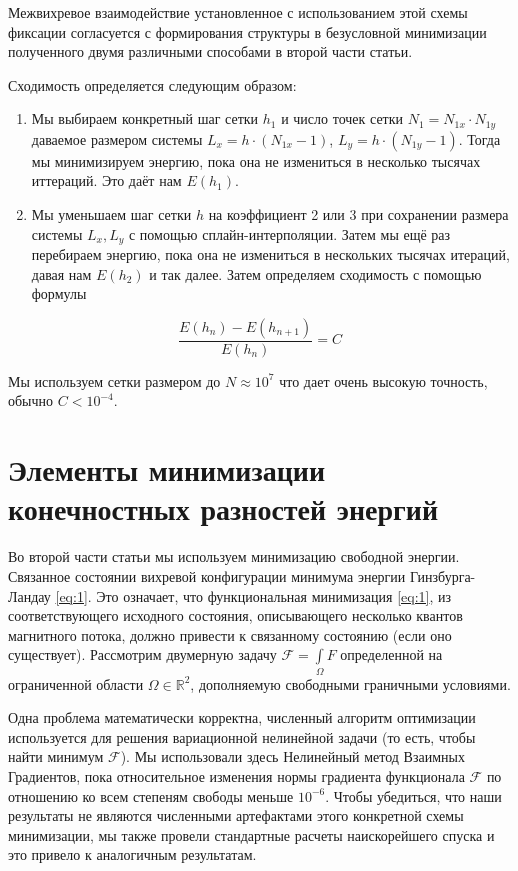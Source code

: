 Межвихревое взаимодействие установленное с использованием этой схемы фиксации 
согласуется с формирования структуры в безусловной минимизации полученного 
двумя различными способами в второй части статьи.

Сходимость определяется следующим образом:
\begin{enumerate}
    \item Мы выбираем конкретный шаг сетки \( h_1 \) и число точек сетки 
        \( N_1 = N_{1x} \cdot N_{1y} \) даваемое размером системы
        \( L_x = h \cdot (N_{1x}-1) \), \( L_y = h \cdot (N_{1y}-1) \). 
        Тогда мы минимизируем энергию, пока она не измениться в несколько
        тысячах иттераций. Это даёт нам \( E(h_1) \).
    \item Мы уменьшаем шаг сетки \( h \) на коэффициент 2 или 3 при сохранении 
        размера системы \( L_x, L_y \) с помощью сплайн-интерполяции. 
        Затем мы ещё раз перебираем энергию, пока она не измениться в 
        нескольких тысячах итераций, давая нам \( E(h_2) \) и так далее. 
        Затем определяем сходимость с помощью формулы
\end{enumerate}
\begin{equation}
    \frac{E(h_n) - E(h_{n+1})}{E(h_n)} = C
\end{equation}

Мы используем сетки размером до \( N \approx 10^7 \) что дает очень высокую 
точность, обычно \( C < 10^{-4} \).

\section{Элементы минимизации конечностных разностей энергий}

Во второй части статьи мы используем минимизацию свободной энергии. Связанное 
состоянии вихревой конфигурации минимума энергии Гинзбурга-Ландау \eqref{eq:1}. 
Это означает, что функциональная минимизация \eqref{eq:1}, из соответствующего 
исходного состояния, описывающего несколько квантов магнитного потока, должно 
привести к связанному состоянию (если оно существует). Рассмотрим двумерную 
задачу \( \mathcal{F} = \int\limits_\Omega F \) определенной на ограниченной 
области \( \Omega \in \mathbb{R}^2 \), дополняемую свободными граничными 
условиями.

Одна проблема математически корректна, численный алгоритм оптимизации 
используется для решения вариационной нелинейной задачи (то есть, чтобы найти 
минимум \( \mathcal{F} \)). Мы использовали здесь Нелинейный метод Взаимных 
Градиентов, пока относительное изменения нормы градиента функционала 
\( \mathcal{F} \) по отношению ко всем степеням свободы меньше \( 10^{-6} \). 
Чтобы убедиться, что наши результаты не являются численными артефактами этого 
конкретной схемы минимизации, мы также провели стандартные расчеты 
наискорейшего спуска и это привело к аналогичным результатам.

